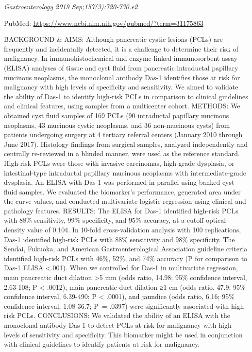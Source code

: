 \documentclass[]{article}
\begin{document}
\emph{Gastroenterology 2019 Sep;157(3):720-730.e2}

PubMed: \url{https://www.ncbi.nlm.nih.gov/pubmed/?term=31175863}

BACKGROUND \& AIMS: Although pancreatic cystic lesions (PCLs) are
frequently and incidentally detected, it is a challenge to determine
their risk of malignancy. In immunohistochemical and enzyme-linked
immunosorbent assay (ELISA) analyses of tissue and cyst fluid from
pancreatic intraductal papillary mucinous neoplasms, the monoclonal
antibody Das-1 identifies those at risk for malignancy with high levels
of specificity and sensitivity. We aimed to validate the ability of
Das-1 to identify high-risk PCLs in comparison to clinical guidelines
and clinical features, using samples from a multicenter cohort. METHODS:
We obtained cyst fluid samples of 169 PCLs (90 intraductal papillary
mucinous neoplasms, 43 mucinous cystic neoplasms, and 36 non-mucinous
cysts) from patients undergoing surgery at 4 tertiary referral centers
(January 2010 through June 2017). Histology findings from surgical
samples, analyzed independently and centrally re-reviewed in a blinded
manner, were used as the reference standard. High-risk PCLs were those
with invasive carcinomas, high-grade dysplasia, or intestinal-type
intraductal papillary mucinous neoplasms with intermediate-grade
dysplasia. An ELISA with Das-1 was performed in parallel using banked
cyst fluid samples. We evaluated the biomarker's performance, generated
area under the curve values, and conducted multivariate logistic
regression using clinical and pathology features. RESULTS: The ELISA for
Das-1 identified high-risk PCLs with 88\% sensitivity, 99\% specificity,
and 95\% accuracy, at a cutoff optical density value of 0.104. In
10-fold cross-validation analysis with 100 replications, Das-1
identified high-risk PCLs with 88\% sensitivity and 98\% specificity.
The Sendai, Fukuoka, and American Gastroenterological Association
guideline criteria identified high-risk PCLs with 46\%, 52\%, and 74\%
accuracy (P for comparison to Das-1 ELISA \textless{}.001). When we
controlled for Das-1 in multivariate regression, main pancreatic duct
dilation \textgreater{}5 mm (odds ratio, 14.98; 95\% confidence
interval, 2.63-108; P \textless{} .0012), main pancreatic duct dilation
≥1 cm (odds ratio, 47.9; 95\% confidence interval, 6.39-490; P
\textless{} .0001), and jaundice (odds ratio, 6.16; 95\% confidence
interval, 1.08-36.7; P~= .0397) were significantly associated with
high-risk PCLs. CONCLUSIONS: We validated the ability of an ELISA with
the monoclonal antibody Das-1 to detect PCLs at risk for malignancy with
high levels of sensitivity and specificity. This biomarker might be used
in conjunction with clinical guidelines to identify patients at risk for
malignancy.
\end{document}
